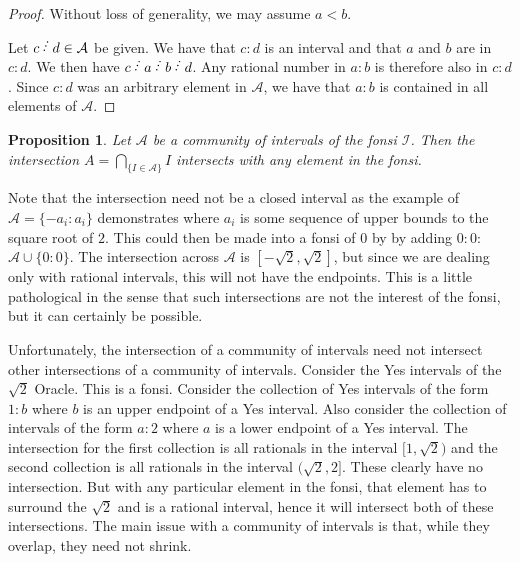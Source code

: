 \documentclass[12pt]{article}
\newtheorem{proposition}{Proposition}[subsection]
\begin{document}
\begin{proof}
    Without loss of generality, we may assume $a < b$.
    
    Let $c\lte d \in \mathcal{A}$ be given. We have that $c:d$ is an interval and that $a$ and $b$ are in $c:d$.   We then have $c \lte a \lte b \lte d$. Any rational number in $a:b$ is therefore also in $c:d$. Since $c:d$ was an arbitrary element in $\mathcal{A}$, we have that $a:b$ is contained in all elements of $\mathcal{A}$.
\end{proof}

\begin{proposition}\label{pr:fonsi-inf-inter}
Let $\mathcal{A}$ be a community of intervals of the fonsi $\mathcal{I}$. Then the intersection $A = \bigcap_{\{ I \in \mathcal{A}\}} I $ intersects with any element in the fonsi. 
\end{proposition}


Note that the intersection need not be a closed interval as the example of $\mathcal{A} = \{ -a_i : a_i \}$ demonstrates where $a_i$ is some sequence of upper bounds to the square root of $2$. This could then be made into a fonsi of 0 by by adding $0:0$:  $\mathcal{A} \cup \{0:0\}$. The intersection across $\mathcal{A}$ is $[-\sqrt{2}, \sqrt{2}]$, but since we are dealing only with rational intervals, this will not have the endpoints. This is a little pathological in the sense that such intersections are not the interest of the fonsi, but it can certainly be possible. 

Unfortunately, the intersection of a community of intervals need not intersect other intersections of a community of intervals. Consider the Yes intervals of the $\sqrt{2}$ Oracle. This is a fonsi. Consider the collection of Yes intervals of the form $1:b$ where $b$ is an upper endpoint of a Yes interval. Also consider the collection of intervals of the form $a:2$ where $a$ is a lower endpoint of a Yes interval. The intersection for the first collection is all rationals in the interval $[1, \sqrt{2})$ and the second collection is all rationals in the interval $(\sqrt{2}, 2]$. These clearly have no intersection. But with any particular element in the fonsi, that element has to surround the $\sqrt{2}$ and is a rational interval, hence it will intersect both of these intersections. The main issue with a community of intervals is that, while they overlap, they need not shrink. 
\end{document}
